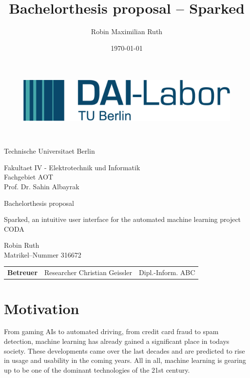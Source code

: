 \documentclass[12pt,a4paper,titlepage,oneside,BCOR1cm]{scrreprt}
\date{\today}
\author{Robin Maximilian Ruth}
\title{Bachelorthesis proposal -- Sparked}
\begin{document}
\thispagestyle{empty}

\begin{figure}[htbp]
\centering
 \begin{minipage}[b]{41 mm}
   \includegraphics[width=40 mm]{./figures/DAI_Logo.png}
 \end{minipage}
\end{figure}

~\vspace{0.5cm}

\begin{center}
\begin{Huge}
Technische Universitaet Berlin\\
\vspace{1mm}
\end{Huge}{\Large Fakultaet IV - Elektrotechnik und Informatik\\
Fachgebiet AOT\\
Prof. Dr. Sahin Albayrak}\\

\vspace{26mm}
\begin{LARGE}
Bachelorthesis proposal\\
\end{LARGE}
\vspace{8mm}
\begin{LARGE}
Sparked, an intuitive user interface for the automated machine learning project CODA\\
\end{LARGE}
\vspace{3 cm}
Robin Ruth\\
Matrikel--Nummer 316672\\
\vspace{1cm}
\begin{tabular}{lll}
    \textbf{Betreuer} & Researcher Christian Geissler & Dipl.-Inform. ABC\\
\end{tabular}

\end{center}

\tableofcontents
\thispagestyle{empty}


\chapter{Motivation}
From gaming AIs to automated driving, from credit card fraud to spam detection, machine learning has already gained a significant place in todays society. 
These developments came over the last decades and are predicted to rise in usage and usability in the coming years.
All in all, machine learning is gearing up to be one of the dominant technologies of the 21st century. 
\end{document}
